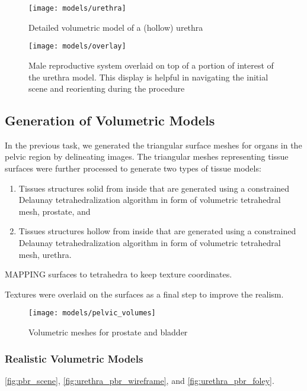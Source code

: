 \begin{figure}
  \centering%
  \texttt{[image: models/urethra]}
  \caption{Detailed volumetric model of a (hollow) urethra}
  \label{fig:urethra}
\end{figure}

\begin{figure}
  \centering%
  \texttt{[image: models/overlay]}
  \caption{Male reproductive system overlaid on top of a portion of interest of the urethra model. This display is helpful in navigating the initial scene and reorienting during the procedure}
  \label{fig:overlay}
\end{figure}

\subsection{Generation of Volumetric Models}
\label{ssec:generation_volume}

In the previous task, we generated the triangular surface meshes for organs in the pelvic region by delineating  images. The triangular meshes representing tissue surfaces were further processed to generate two types of tissue models:
\begin{enumerate}
  \item Tissues structures solid from inside that are generated using a constrained Delaunay tetrahedralization algorithm \cite{tetwild} in form of volumetric tetrahedral mesh, \eg prostate, and
  \item Tissues structures hollow from inside that are generated using a constrained Delaunay tetrahedralization algorithm \cite{tetwild} in form of volumetric tetrahedral mesh, \eg urethra.
\end{enumerate}

MAPPING surfaces to tetrahedra to keep texture coordinates.

Textures were overlaid on the surfaces as a final step to improve the realism.

\begin{figure}
  \centering%
  \texttt{[image: models/pelvic\_volumes]}
  \caption{Volumetric meshes for prostate and bladder}
  \label{fig:organ_prostate_bladder_generation}
\end{figure}

\subsubsection{Realistic Volumetric Models}
\autoref{fig:pbr_scene}, \autoref{fig:urethra_pbr_wireframe}, and \autoref{fig:urethra_pbr_foley}.

